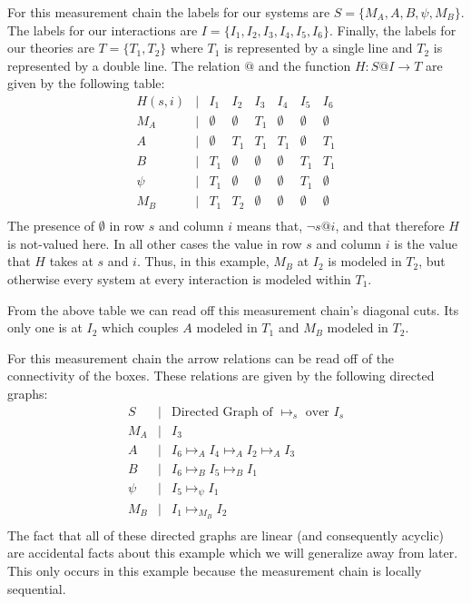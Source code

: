 \documentclass[prd,twocolumn,superscriptaddress,floatfix,amsmath,amssymb,amsfonts,nofootinbib]{revtex4-2}
\begin{document}
For this measurement chain the labels for our systems are $S=\{M_A,A,B,\psi,M_B\}$. The labels for our interactions are $I=\{I_1,I_2,I_3,I_4,I_5,I_6\}$. Finally, the labels for our theories are $T=\{T_1,T_2\}$ where $T_1$ is represented by a single line and $T_2$ is represented by a double line. The relation $@$ and the function $H:S@I\to T$ are given by the following table:
\[\begin{array}{cccccccc}
H(s,i) & \vert & I_1 & I_2 & I_3 & I_4 & I_5 & I_6\\
M_A & \vert & \emptyset & \emptyset & T_1 & \emptyset & \emptyset & \emptyset\\
A & \vert & \emptyset & T_1 & T_1 & T_1 & \emptyset & T_1\\
B & \vert & T_1 & \emptyset & \emptyset & \emptyset & T_1 & T_1\\
\psi & \vert & T_1 & \emptyset & \emptyset & \emptyset & T_1 & \emptyset\\
M_B & \vert & T_1 & T_2 & \emptyset & \emptyset & \emptyset & \emptyset\\
\end{array}\]
The presence of $\emptyset$ in row $s$ and column $i$ means that, $\neg s@i$, and that therefore $H$ is not-valued here. In all other cases the value in row $s$ and column $i$ is the value that $H$ takes at $s$ and $i$. Thus, in this example, $M_B$ at $I_2$ is modeled in $T_2$, but otherwise every system at every interaction is modeled within $T_1$.

From the above table we can read off this measurement chain's diagonal cuts. Its only one is at $I_2$ which couples $A$ modeled in $T_1$ and $M_B$ modeled in $T_2$.

For this measurement chain the arrow relations can be read off of the connectivity of the boxes. These relations are given by the following directed graphs:
\[\begin{array}{ccl}
S & \vert & \text{Directed Graph of }\mapsto_s\text{ over }I_s\\
M_A & \vert & I_3\\
A & \vert & I_6\mapsto_A I_4\mapsto_A I_2\mapsto_A I_3\\
B & \vert & I_6\mapsto_B I_5\mapsto_B I_1\\
\psi & \vert & I_5\mapsto_\psi I_1\\
M_B & \vert & I_1\mapsto_{M_B} I_2\\
\end{array}\]
The fact that all of these directed graphs are linear (and consequently acyclic) are accidental facts about this example which we will generalize away from later. This only occurs in this example because the measurement chain is locally sequential.
\end{document}
